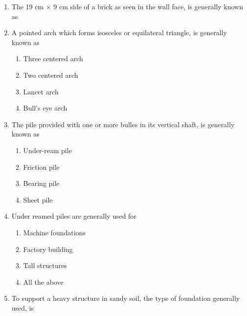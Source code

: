 \documentclass[11pt,a4paper]{article}
\begin{document}
\begin{enumerate}
\\
\item{The 19 cm $\times$ 9 cm side of a brick as seen in the wall face, is generally known as
}
\\
\item{A pointed arch which forms isosceles or equilateral triangle, is generally known as}
\begin{enumerate}[label=\Alph*.]
\item{Three centered arch}
\item{Two centered arch}
\item{Lancet arch}
\item{Bull's eye arch}
\end{enumerate}
\item{The pile provided with one or more bulles in its vertical shaft, is generally known as}
\begin{enumerate}[label=\Alph*.]
\item{Under-ream pile}
\item{Friction pile}
\item{Bearing pile}
\item{Sheet pile}
\end{enumerate}
\item{Under reamed piles are generally used for}
\begin{enumerate}[label=\Alph*.]
\item{Machine foundations}
\item{Factory building}
\item{Tall structures}
\item{All the above}
\end{enumerate}
\item{To support a heavy structure in sandy soil, the type of foundation generally used, is}
\begin{enumerate}[label=\Alph*.]

\end{enumerate}
\end{enumerate}
\end{document}
